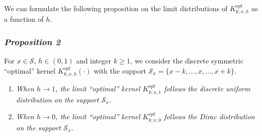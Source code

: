 We can formulate the following proposition on the limit distributions of \(K_{k;x,h}^{opt}\) as a function of \(h\).

\subsubsection{\texorpdfstring{\emph{Proposition 2}}{Proposition 2}}\label{proposition-2}

For \(x\in\mathcal{S}\), \(h\in(0,1)\) and integer \(k\geq1\), we consider the discrete symmetric ``optimal'' kernel \(K_{k;x,h}^{opt}(\cdot)\) with the support \(\mathcal{S}_{x}=\{x-k,\ldots,x,\ldots,x+k\}\).

\begin{enumerate}
\def\labelenumi{\roman{enumi}.}
\tightlist
\item
  \emph{When \(h\to 1\), the limit ``optimal'' kernel \(K_{k;x,1}^{opt}\) follows the discrete uniform distribution on the support \(\mathcal{S}_{x}\).}
\item
  \emph{When \(h\to 0\), the limit ``optimal'' kernel \(K_{k;x,0}^{opt}\) follows the Dirac distribution on the support \(\mathcal{S}_{x}\).}\\
\end{enumerate}

